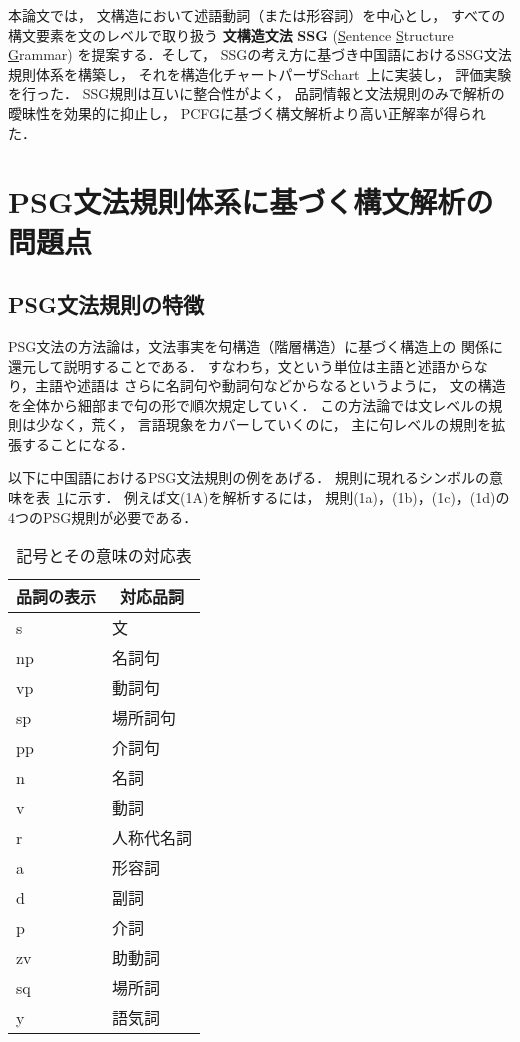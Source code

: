 \documentclass[japanese]{jnlp_1.3a}
\begin{document}
本論文では，
文構造において述語動詞（または形容詞）を中心とし，
すべての構文要素を文のレベルで取り扱う
{\bf 文構造文法}
{\bf SSG}
(\underline{S}entence 
\underline{S}tructure 
\underline{G}rammar)
を提案する．そして，
SSGの考え方に基づき中国語におけるSSG文法規則体系を構築し，
それを構造化チャートパーザSchart~\cite{schart}上に実装し，
評価実験を行った．
SSG規則は互いに整合性がよく，
品詞情報と文法規則のみで解析の曖昧性を効果的に抑止し，
PCFGに基づく構文解析より高い正解率が得られた．

\section{PSG文法規則体系に基づく構文解析の問題点}


\subsection{PSG文法規則の特徴}
PSG文法の方法論は，文法事実を句構造（階層構造）に基づく構造上の
関係に還元して説明することである．
すなわち，文という単位は主語と述語からなり，主語や述語は
さらに名詞句や動詞句などからなるというように，
文の構造を全体から細部まで句の形で順次規定していく．
この方法論では文レベルの規則は少なく，荒く，
言語現象をカバーしていくのに，
主に句レベルの規則を拡張することになる．

以下に中国語におけるPSG文法規則の例をあげる．
規則に現れるシンボルの意味を表~\ref{tab:cpos}に示す．
例えば文(1A)を解析するには，
規則(1a)，(1b)，(1c)，(1d)の4つのPSG規則が必要である．

\begin{table}[b]
  \centering
  \caption{記号とその意味の対応表}
\begin{tabular}{|l|l|} \hline
\multicolumn{1}{|c|}{品詞の表示} &
\multicolumn{1}{|c|}{対応品詞}\\\hline
s  & 文\\
np & 名詞句 \\
vp & 動詞句  \\
sp & 場所詞句\\
pp & 介詞句  \\
n & 名詞 \\
v & 動詞  \\
r & 人称代名詞 \\
a & 形容詞 \\
d & 副詞 \\
p & 介詞 \\
zv &助動詞 \\
sq &場所詞 \\
y &語気詞 \\
\hline
  \end{tabular}
  \label{tab:cpos}
\end{table}
\end{document}
